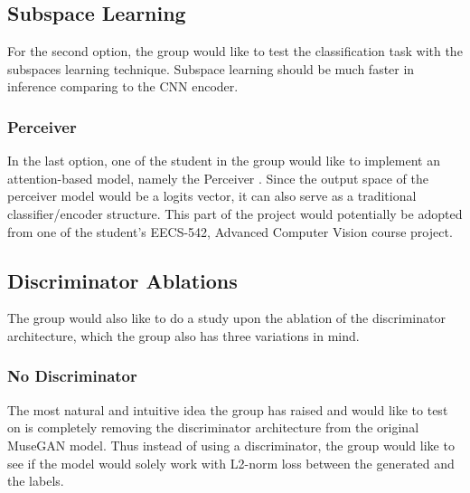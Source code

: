 \begin{par}

        \subsection{Subspace Learning} %
        \label{ssub:Subspace Learning}
            \par For the second option, the group would like to test the classification task with the subspaces learning technique. Subspace learning should be much faster in inference comparing to the CNN encoder. 

        \subsubsection{Perceiver} %
        \label{ssub:Perceiver}
            \par In the last option, one of the student in the group would like to implement an attention-based model, namely the Perceiver \cite{perceiver}. Since the output space of the perceiver model would be a logits vector, it can also serve as a traditional classifier/encoder structure. This part of the project would potentially be adopted from one of the student's EECS-542, Advanced Computer Vision course project. 

    \subsection{Discriminator Ablations} %
    \label{sub:Discriminator Ablations}
        \par The group would also like to do a study upon the ablation of the discriminator architecture, which the group also has three variations in mind. 

        \subsubsection{No Discriminator} %
        \label{ssub:No Discriminator}
            \par The most natural and intuitive idea the group has raised and would like to test on is completely removing the discriminator architecture from the original MuseGAN model.  Thus instead of using a discriminator, the group would like to see if the model would solely work with L2-norm loss between the generated and the labels.
            


    
    



\end{par}